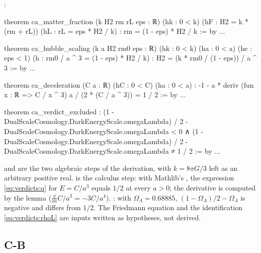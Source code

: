 :
\begin{leancode}
theorem ca_matter_fraction (k H2 rm rL eps : ℝ) (hk : 0 < k)
    (hF : H2 = k * (rm + rL)) (hL : rL = eps * H2 / k) :
    rm = (1 - eps) * H2 / k := by ...

theorem ca_hubble_scaling (k a H2 rm0 eps : ℝ) (hk : 0 < k) (ha : 0 < a)
    (he : eps < 1) (h : rm0 / a ^ 3 = (1 - eps) * H2 / k) :
    H2 = (k * rm0 / (1 - eps)) / a ^ 3 := by ...

theorem ca_deceleration (C a : ℝ) (hC : 0 < C) (ha : 0 < a) :
    -1 - a * deriv (fun x : ℝ => C / x ^ 3) a / (2 * (C / a ^ 3)) = 1 / 2 := by ...

theorem ca_verdict_excluded :
    (1 - DualScaleCosmology.DarkEnergyScale.omegaLambda) / 2
        - DualScaleCosmology.DarkEnergyScale.omegaLambda < 0 ∧
      (1 - DualScaleCosmology.DarkEnergyScale.omegaLambda) / 2
        - DualScaleCosmology.DarkEnergyScale.omegaLambda ≠ 1 / 2 := by ...
\end{leancode}
\begin{leanbox}
 and  are the two algebraic steps of the
derivation, with $k=8\pi G/3$ left as an arbitrary positive real.  is the
calculus step: with Mathlib's , the expression \eqref{eq:verdicts:q} for $E=C/a^3$
equals $1/2$ at every $a>0$; the derivative is computed by the lemma 
($\frac{\dd}{\dd a}C/a^3=-3C/a^4$). : with $\Omega_\Lambda=0.68885$,
$(1-\Omega_\Lambda)/2-\Omega_\Lambda$ is negative and differs from $1/2$. The Friedmann equation and
the identification \eqref{eq:verdicts:rhoL} are inputs written as hypotheses, not derived.
\end{leanbox}

\subsection{C-B}

